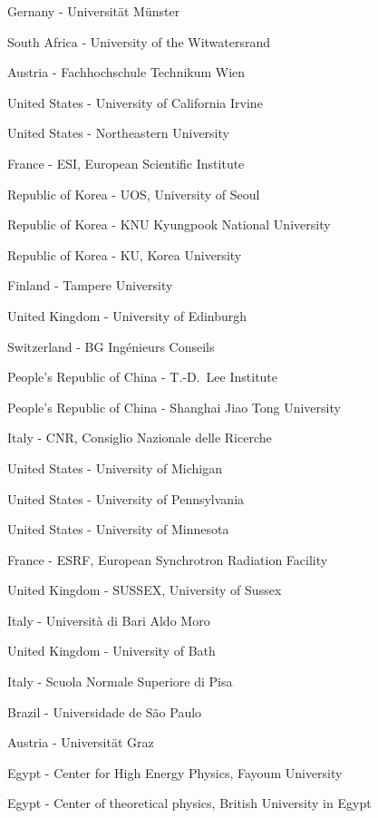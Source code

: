 \item[$^{288}$] Gernany - Universit{\"a}t M{\"u}nster
\item[$^{289}$] South Africa - University of the Witwatersrand
\item[$^{290}$] Austria - Fachhochschule Technikum Wien
\item[$^{291}$] United States - University of California Irvine
\item[$^{292}$] United States - Northeastern University
\item[$^{293}$] France - ESI, European Scientific Institute
\item[$^{294}$] Republic of Korea - UOS, University of Seoul
\item[$^{295}$] Republic of Korea - KNU Kyungpook National University
\item[$^{296}$] Republic of Korea - KU, Korea University
\item[$^{297}$] Finland - Tampere University
\item[$^{298}$] United Kingdom - University of Edinburgh
\item[$^{299}$] Switzerland - BG Ing{\'e}nieurs Conseils
\item[$^{300}$] People's Republic of China - T.-D.~Lee Institute
\item[$^{301}$] People's Republic of China - Shanghai Jiao Tong University
\item[$^{302}$] Italy - CNR, Consiglio Nazionale delle Ricerche
\item[$^{303}$] United States - University of Michigan
\item[$^{304}$] United States - University of Pennsylvania
\item[$^{305}$] United States - University of Minnesota
\item[$^{306}$] France - ESRF, European Synchrotron Radiation Facility
\item[$^{307}$] United Kingdom - SUSSEX, University of Sussex
\item[$^{308}$] Italy - Universit{\`a} di Bari Aldo Moro
\item[$^{309}$] United Kingdom - University of Bath
\item[$^{310}$] Italy - Scuola Normale Superiore di Pisa
\item[$^{311}$] Brazil - Universidade de S{\~a}o Paulo
\item[$^{312}$] Austria - Universit{\"a}t Graz
\item[$^{313}$] Egypt - Center for High Energy Physics, Fayoum University
\item[$^{314}$] Egypt - Center of theoretical physics, British University in Egypt
